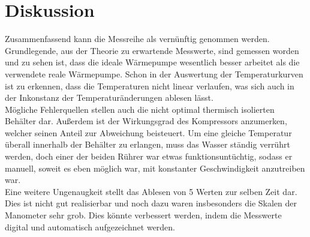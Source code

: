 \section{Diskussion}
\label{sec:Diskussion}
Zusammenfassend kann die Messreihe als vernünftig genommen werden.
Grundlegende, aus der Theorie zu erwartende Messwerte, sind gemessen worden
und zu sehen ist, dass die ideale Wärmepumpe wesentlich besser arbeitet als
die verwendete reale Wärmepumpe.
Schon in der Auswertung der Temperaturkurven ist zu erkennen, dass die
Temperaturen nicht linear verlaufen, was sich auch in der Inkonstanz der
Temperaturänderungen ablesen lässt.
\\
Mögliche Fehlerquellen stellen auch die nicht optimal thermisch isolierten
Behälter dar. Außerdem ist der Wirkungsgrad des Kompressors anzumerken, welcher
seinen Anteil zur Abweichung beisteuert.
Um eine gleiche Temperatur überall innerhalb der Behälter zu erlangen, muss
das Wasser ständig verrührt werden, doch einer der beiden Rührer war etwas
funktionsuntüchtig, sodass er manuell, soweit es eben möglich war, mit
konstanter Geschwindigkeit anzutreiben war.
\\
Eine weitere Ungenaugkeit stellt das Ablesen von 5 Werten zur selben Zeit dar.
Dies ist nicht gut realisierbar und noch dazu waren insbesonders die Skalen der
Manometer sehr grob.
Dies könnte verbessert werden, indem die Messwerte digital und automatisch
aufgezeichnet werden.
